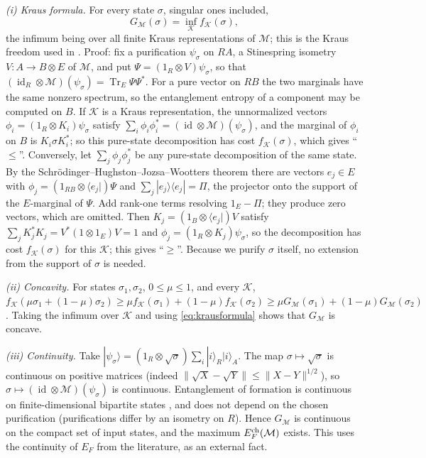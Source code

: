 \documentclass[11pt]{article}
\newcommand{\Tr}{\operatorname{Tr}}
\begin{document}
\emph{(i) Kraus formula.} For every state $\sigma$, singular ones included,
\begin{equation}\label{eq:krausformula}
 G_{\mathcal M}(\sigma)=\inf_{\mathcal K}f_{\mathcal K}(\sigma),
\end{equation}
the infimum being over all finite Kraus representations of $\mathcal M$; this is the Kraus freedom used in \cite[(C.1)]{tang}. Proof: fix a purification $\psi_\sigma$ on $RA$, a Stinespring isometry $V:A\to B\otimes E$ of $\mathcal M$, and put $\Psi=(1_R\otimes V)\psi_\sigma$, so that $(\operatorname{id}_R\otimes\mathcal M)(\psi_\sigma)=\Tr_E\Psi\Psi^*$. For a pure vector on $RB$ the two marginals have the same nonzero spectrum, so the entanglement entropy of a component may be computed on $B$. If $\mathcal K$ is a Kraus representation, the unnormalized vectors $\phi_i=(1_R\otimes K_i)\psi_\sigma$ satisfy $\sum_i\phi_i\phi_i^*=(\operatorname{id}\otimes\mathcal M)(\psi_\sigma)$, and the marginal of $\phi_i$ on $B$ is $K_i\sigma K_i^*$; so this pure-state decomposition has cost $f_{\mathcal K}(\sigma)$, which gives ``$\le$''. Conversely, let $\sum_j\phi_j\phi_j^*$ be any pure-state decomposition of the same state. By the Schr\"odinger--Hughston--Jozsa--Wootters theorem \cite{hjw} there are vectors $e_j\in E$ with $\phi_j=(1_{RB}\otimes\langle e_j|)\Psi$ and $\sum_j|e_j\rangle\langle e_j|=\Pi$, the projector onto the support of the $E$-marginal of $\Psi$. Add rank-one terms resolving $1_E-\Pi$; they produce zero vectors, which are omitted. Then $K_j=(1_B\otimes\langle e_j|)V$ satisfy $\sum_jK_j^*K_j=V^*(1\otimes 1_E)V=1$ and $\phi_j=(1_R\otimes K_j)\psi_\sigma$, so the decomposition has cost $f_{\mathcal K}(\sigma)$ for this $\mathcal K$; this gives ``$\ge$''. Because we purify $\sigma$ itself, no extension from the support of $\sigma$ is needed.

\emph{(ii) Concavity.} For states $\sigma_1,\sigma_2$, $0\le\mu\le1$, and every $\mathcal K$,
$f_{\mathcal K}(\mu\sigma_1+(1-\mu)\sigma_2)\ge\mu f_{\mathcal K}(\sigma_1)+(1-\mu)f_{\mathcal K}(\sigma_2)\ge\mu G_{\mathcal M}(\sigma_1)+(1-\mu)G_{\mathcal M}(\sigma_2)$. Taking the infimum over $\mathcal K$ and using \eqref{eq:krausformula} shows that $G_{\mathcal M}$ is concave.

\emph{(iii) Continuity.} Take $|\psi_\sigma\rangle=(1_R\otimes\sqrt\sigma)\sum_i|i\rangle_R|i\rangle_A$. The map $\sigma\mapsto\sqrt\sigma$ is continuous on positive matrices (indeed $\|\sqrt X-\sqrt Y\|\le\|X-Y\|^{1/2}$), so $\sigma\mapsto(\operatorname{id}\otimes\mathcal M)(\psi_\sigma)$ is continuous. Entanglement of formation is continuous on finite-dimensional bipartite states \cite{nielsen,winter}, and does not depend on the chosen purification (purifications differ by an isometry on $R$). Hence $G_{\mathcal M}$ is continuous on the compact set of input states, and the maximum $E_F^{\rm ch}(\mathcal M)$ exists. This uses the continuity of $E_F$ from the literature, as an external fact.
\end{document}
